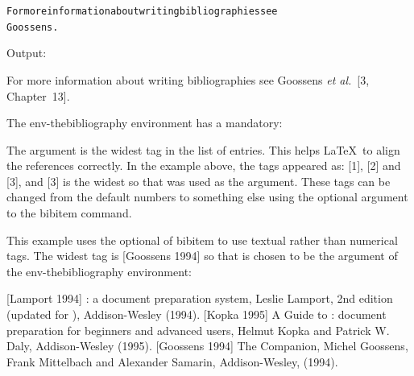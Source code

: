 \begin{code}
\begin{alltt}
For more information about writing bibliographies see 
Goossens .
\end{alltt}
\end{code}%
Output:
\begin{result}
For more information about writing bibliographies see 
Goossens \emph{et al.}~[3, Chapter~13].
\end{result}

The \gls{env-thebibliography} environment has
a \gls{mandatory}:
\begin{definition}
\end{definition}%
The argument  is the widest tag in the list of
entries.  This helps \LaTeX\ to align the references correctly.  In
the example above, the tags appeared as: [1], [2] and [3], and [3]
is the widest so that was used as the argument. These tags can be
changed from the default numbers to something else using
the optional argument to the \gls{bibitem} command. 


This example uses the \gls{optional} of \gls{bibitem} to use textual
rather than numerical tags.  The widest tag is [Goossens 1994]
so that is chosen to be the argument of the \gls{env-thebibliography}
environment:
\begin{code}
\newline
\mbox{}\newline
{}[Lamport 1994] 
\cmdname{ } : a document 
preparation system, Leslie Lamport, 2nd edition 
(updated for ), Addison-Wesley (1994).\newline
\mbox{}\newline
{}[Kopka 1995] 
A Guide to : document 
preparation for beginners and advanced users, Helmut Kopka 
and Patrick W. Daly, Addison-Wesley (1995).\newline
\mbox{}\newline
{}[Goossens 1994] 
The Companion, 
Michel Goossens, Frank Mittelbach and
Alexander Samarin, Addison-Wesley, (1994).\newline
\mbox{}\newline
{}
\end{code}
\begin{result}
\dobibexamplelabelled
\end{result}

